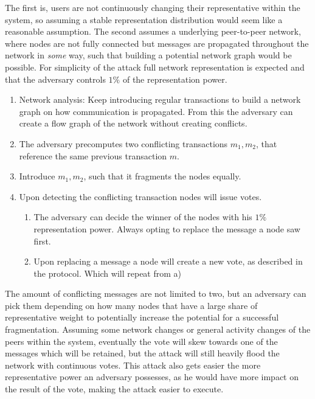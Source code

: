 The first is, users are not continuously changing their representative within the system, so assuming a stable representation distribution would seem like a reasonable assumption. The second assumes a underlying peer-to-peer network, where nodes are not fully connected but messages are propagated throughout the network in \emph{some} way, such that building a potential network graph would be possible. For simplicity of the attack full network representation is expected and that the adversary controls $1\%$ of the representation power.

\begin{enumerate}
    \item Network analysis: Keep introducing regular transactions to build a network graph on how communication is propagated. From this the adversary can create a flow graph of the network without creating conflicts.
    \item The adversary precomputes two conflicting transactions $m_1, m_2$, that reference the same previous transaction $m$.
    \item Introduce $m_1, m_2$, such that it fragments the nodes equally.
    \item Upon detecting the conflicting transaction nodes will issue votes.
    \begin{enumerate}
        \item The adversary can decide the winner of the nodes with his $1\%$ representation power. Always opting to replace the message a node saw first.
        \item Upon replacing a message a node will create a new vote, as described in the protocol. Which will repeat from a)
    \end{enumerate}
\end{enumerate}

The amount of conflicting messages are not limited to two, but an adversary can pick them depending on how many nodes that have a large share of representative weight to potentially increase the potential for a successful fragmentation. Assuming some network changes or general activity changes of the peers within the system, eventually the vote will skew towards one of the messages which will be retained, but the attack will still heavily flood the network with continuous votes. This attack also gets easier the more representative power an adversary possesses, as he would have more impact on the result of the vote, making the attack easier to execute.



